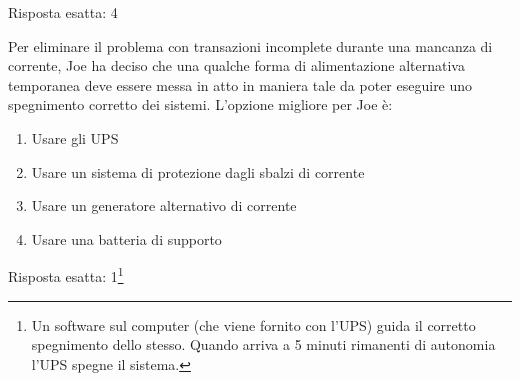 \begin{Answer} [
  ref={esSFDP3},
  number={3}
  ]

  \Question Risposta esatta: 4

\end{Answer}


\begin{Exercise} [
  title={Quiz},
  label={esSFDP4}
  ]

  \Question Per eliminare il problema con transazioni incomplete durante una 
mancanza di corrente, Joe ha deciso che una qualche forma di alimentazione 
alternativa temporanea deve essere messa in atto in maniera tale da poter 
eseguire uno spegnimento corretto dei sistemi. L'opzione migliore per Joe è:
\begin{enumerate}
 \item Usare gli UPS
 \item Usare un sistema di protezione dagli sbalzi di corrente
 \item Usare un generatore alternativo di corrente
 \item Usare una batteria di supporto
\end{enumerate}
  
\end{Exercise}


\begin{Answer} [
  ref={esSFDP4},
  number={4}
  ]

  \Question Risposta esatta: 1\footnote{Un software sul computer (che viene 
fornito con l'UPS) guida il corretto spegnimento dello stesso. Quando arriva a 
5 minuti rimanenti di autonomia l'UPS spegne il sistema.}

\end{Answer}
